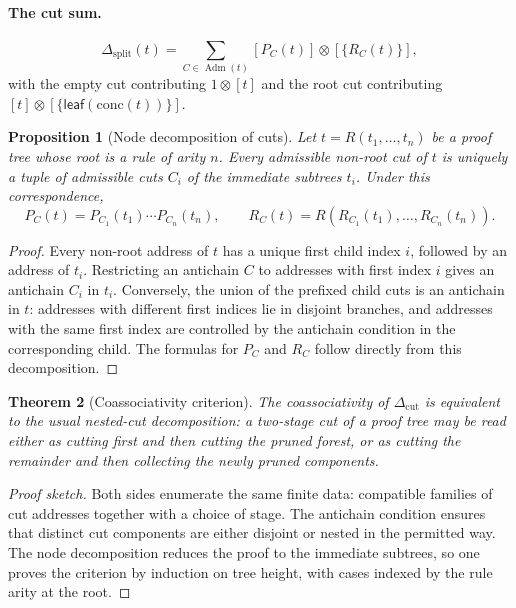 \documentclass[11pt]{article}
\newtheorem{theorem}{Theorem}
\newtheorem{proposition}[theorem]{Proposition}
\begin{document}
\paragraph{The cut sum.}
\[
\Delta_{\mathrm{split}}(t)
=
\sum_{C\in\operatorname{Adm}(t)}
[P_C(t)]\otimes [\{R_C(t)\}],
\]
with the empty cut contributing $1\otimes[t]$ and the root cut contributing $[t]\otimes[\{\mathsf{leaf}(\mathrm{conc}(t))\}]$.

\begin{proposition}[Node decomposition of cuts]
Let \(t=R(t_1,\ldots,t_n)\) be a proof tree whose root is a rule of arity
\(n\).  Every admissible non-root cut of \(t\) is uniquely a tuple of
admissible cuts \(C_i\) of the immediate subtrees \(t_i\).  Under this
correspondence,
\[
P_C(t)=P_{C_1}(t_1)\cdots P_{C_n}(t_n),
\qquad
R_C(t)=R(R_{C_1}(t_1),\ldots,R_{C_n}(t_n)).
\]
\end{proposition}

\begin{proof}
Every non-root address of \(t\) has a unique first child index \(i\), followed
by an address of \(t_i\).  Restricting an antichain \(C\) to addresses with
first index \(i\) gives an antichain \(C_i\) in \(t_i\).  Conversely, the union
of the prefixed child cuts is an antichain in \(t\): addresses with different
first indices lie in disjoint branches, and addresses with the same first
index are controlled by the antichain condition in the corresponding child.
The formulas for \(P_C\) and \(R_C\) follow directly from this decomposition.
\end{proof}

\begin{theorem}[Coassociativity criterion]
The coassociativity of \(\Delta_{\mathrm{cut}}\) is equivalent to the usual
nested-cut decomposition: a two-stage cut of a proof tree may be read either
as cutting first and then cutting the pruned forest, or as cutting the
remainder and then collecting the newly pruned components.
\end{theorem}

\begin{proof}[Proof sketch]
Both sides enumerate the same finite data: compatible families of cut
addresses together with a choice of stage.  The antichain condition ensures
that distinct cut components are either disjoint or nested in the permitted
way.  The node decomposition reduces the proof to the immediate subtrees, so
one proves the criterion by induction on tree height, with cases indexed by
the rule arity at the root.
\end{proof}
\end{document}
